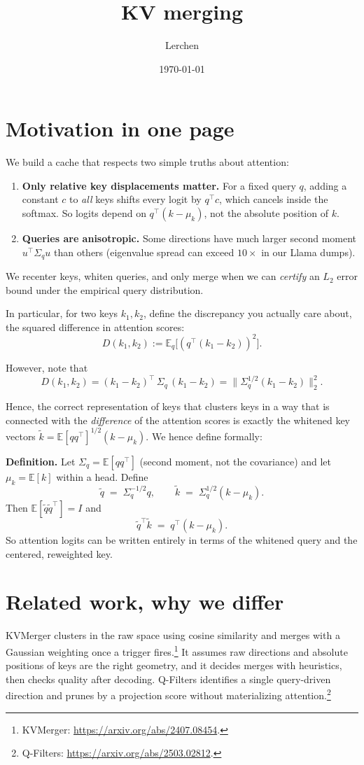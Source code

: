 \documentclass[11pt]{article}
\title{\textbf{KV merging}}
\author{Lerchen}
\date{\today}
\newcommand{\E}{\mathbb{E}}
\begin{document}
\maketitle

\section*{Motivation in one page}
We build a cache that respects two simple truths about attention:
\begin{enumerate}
  \item \textbf{Only relative key displacements matter.} For a fixed query $q$, adding a constant $c$ to \emph{all} keys shifts every logit by $q^\top c$, which cancels inside the softmax. So logits depend on $q^\top (k-\mu_k)$, not the absolute position of $k$. 
  \item \textbf{Queries are anisotropic.} Some directions have much larger second moment $u^\top\Sigma_q u$ than others
(eigenvalue spread can exceed $10\times$ in our Llama dumps).
\end{enumerate}
We recenter keys, whiten queries, and only merge when we can \emph{certify} an $L_2$ error bound under the empirical query distribution. 

\noindent In particular, for two keys \( k_1, k_2 \), define the discrepancy you actually care about, the squared difference in attention scores:
\[
D(k_1, k_2) := \mathbb{E}_q \big[ (q^\top (k_1 - k_2))^2 \big].
\]

\noindent However, note that 
\[D(k_1,k_2)=(k_1-k_2)^\top\,\Sigma_q\,(k_1-k_2)
=\big\|\Sigma_q^{1/2}(k_1-k_2)\big\|_2^2.\]

\noindent Hence, the correct representation of keys that clusters keys in a way that is connected with the \textit{difference} of the attention scores is exactly the whitened key vectors $\tilde k = \E[qq^\top]^{1/2} (k-\mu_k)$. We hence define formally:

\noindent \textbf{Definition.} Let $\Sigma_q=\E[qq^\top]$ (second moment, not the covariance) and let $\mu_k=\E[k]$ within a head. Define
\[
\tilde q \;=\; \Sigma_q^{-1/2}q,\qquad 
\tilde k \;=\; \Sigma_q^{1/2}(k-\mu_k).
\]
Then $\E[\tilde q \tilde q^\top]=I$ and
\[
\tilde q^\top \tilde k \;=\; q^\top (k-\mu_k).
\]
So attention logits can be written entirely in terms of the whitened query and the centered, reweighted key. 


\section*{Related work, why we differ}
KVMerger clusters in the raw space using cosine similarity and merges with a Gaussian weighting once a trigger fires.\footnote{KVMerger: \url{https://arxiv.org/abs/2407.08454}.} It assumes raw directions and absolute positions of keys are the right geometry, and it decides merges with heuristics, then checks quality after decoding. 
Q-Filters identifies a single query-driven direction and prunes by a projection score without materializing attention.\footnote{Q-Filters: \url{https://arxiv.org/abs/2503.02812}.} 
\end{document}
